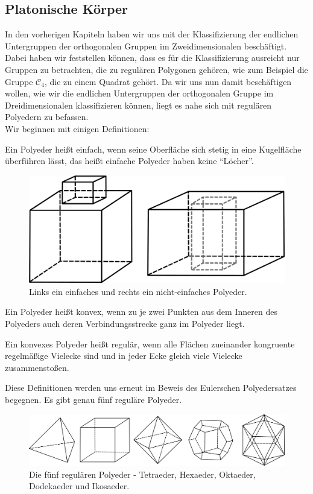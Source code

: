 \subsection{Platonische Körper}
In den vorherigen Kapiteln haben wir uns mit der Klassifizierung der endlichen Untergruppen der orthogonalen Gruppen im Zweidimensionalen beschäftigt. Dabei haben wir feststellen können, dass es für die Klassifizierung ausreicht nur Gruppen zu betrachten, die zu regulären Polygonen gehören, wie zum Beispiel die Gruppe $\mathcal{C}_4$, die zu einem Quadrat gehört. Da wir uns nun damit beschäftigen wollen, wie wir die endlichen Untergruppen der orthogonalen Gruppe im Dreidimensionalen klassifizieren können, liegt es nahe sich mit regulären Polyedern zu befassen.\\
Wir beginnen mit einigen Definitionen:
\begin{defi}
	Ein Polyeder heißt einfach, wenn seine Oberfläche sich stetig in eine Kugelfläche überführen lässt, das heißt einfache Polyeder haben keine \enquote{Löcher}. \citep[211]{Mainzer1988}
\end{defi}
\begin{figure}[H]
    \centering
    \includegraphics[width=0.6\linewidth]{grafiken/einfache_polyeder_vergleich.pdf}
    \caption{Links ein einfaches und rechts ein nicht-einfaches Polyeder.}
\end{figure}
\begin{defi}
	Ein Polyeder heißt konvex, wenn zu je zwei Punkten aus dem Inneren des Polyeders auch deren Verbindungsstrecke ganz im Polyeder liegt. \citep[51]{Mueller2012}
\end{defi}
\begin{defi}
	Ein konvexes Polyeder heißt regulär, wenn alle Flächen zueinander kongruente regelmäßige Vielecke sind und in jeder Ecke gleich viele Vielecke zusammenstoßen. \citep[51]{Mueller2012}
\end{defi}
Diese Definitionen werden uns erneut im Beweis des Eulerschen Polyedersatzes begegnen. Es gibt genau fünf reguläre Polyeder.\\
\begin{figure}[H]
    \centering
    \includegraphics[width=0.9\linewidth]{grafiken/platonische_koerper.pdf}
    \caption{Die fünf regulären Polyeder - Tetraeder, Hexaeder, Oktaeder, Dodekaeder und Ikosaeder.}
    \label{fig:grafiken/platonische_koerper}
\end{figure}
